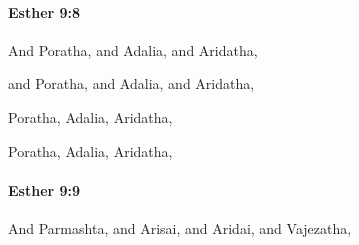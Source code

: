 		\paragraph{Esther 9:8} %
			\label{ESTHER-9-8}

			And Poratha, and Adalia, and Aridatha,

			\begin{versebox}
					\item[BHS] 
					\item[LXX] 
					\item[ASV] and Poratha, and Adalia, and Aridatha,
					\item[NIV] Poratha, Adalia, Aridatha,
					\item[NRSV] Poratha, Adalia, Aridatha,
			\end{versebox}

		\paragraph{Esther 9:9} %
			\label{ESTHER-9-9}

			And Parmashta, and Arisai, and Aridai, and Vajezatha,

